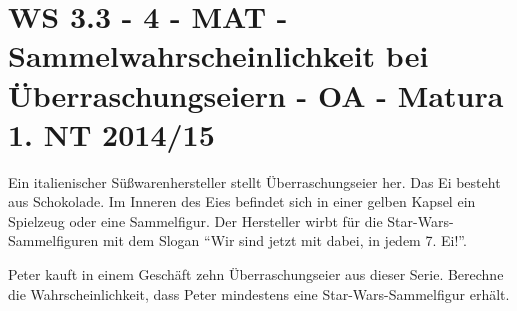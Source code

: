 \section{WS 3.3 - 4 - MAT - Sammelwahrscheinlichkeit bei Überraschungseiern - OA - Matura 1. NT 2014/15}

\begin{beispiel}[WS 3.3]{1}
Ein italienischer Süßwarenhersteller stellt Überraschungseier her. Das Ei besteht aus Schokolade. Im Inneren des Eies befindet sich in einer gelben Kapsel ein Spielzeug oder eine Sammelfigur. Der Hersteller wirbt für die Star-Wars-Sammelfiguren mit dem Slogan "`Wir sind jetzt mit dabei, in
jedem 7. Ei!"'. 

Peter kauft in einem Geschäft zehn Überraschungseier aus dieser Serie. Berechne die Wahrscheinlichkeit, dass Peter mindestens eine Star-Wars-Sammelfigur erhält. 

\end{beispiel}